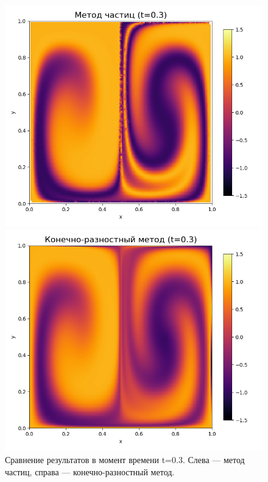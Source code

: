 \documentclass[a4paper,12pt]{article}
\begin{document}
\begin{figure}[H]
    \centering
    \begin{minipage}{0.49\textwidth}
        \centering
        \includegraphics[width=\linewidth]{comparison_results/particle_method_t_0.3.png}
    \end{minipage}
    \hfill
    \begin{minipage}{0.49\textwidth}
        \centering
        \includegraphics[width=\linewidth]{comparison_results/fdm_method_t_0.3.png}
    \end{minipage}
    \caption{Сравнение результатов в момент времени t=0.3. Слева — метод частиц, справа — конечно-разностный метод.}
    \label{fig:t03}
\end{figure}
\end{document}
